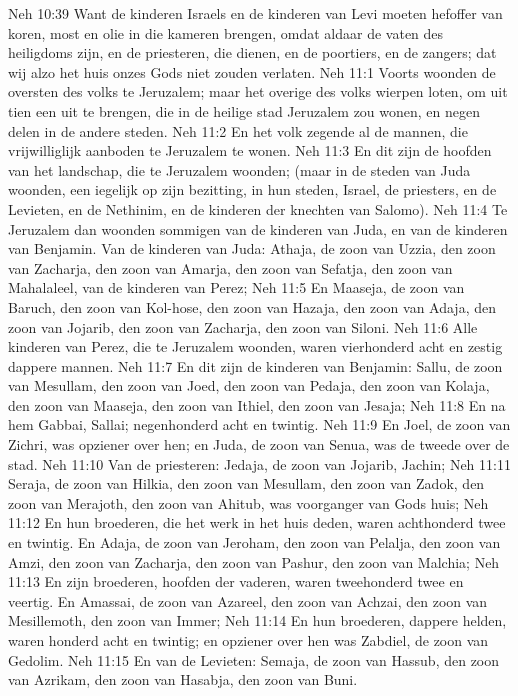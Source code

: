 Neh 10:39  Want de kinderen Israels en de kinderen van Levi moeten hefoffer van koren, most en olie in die kameren brengen, omdat aldaar de vaten des heiligdoms zijn, en de priesteren, die dienen, en de poortiers, en de zangers; dat wij alzo het huis onzes Gods niet zouden verlaten.
Neh 11:1  Voorts woonden de oversten des volks te Jeruzalem; maar het overige des volks wierpen loten, om uit tien een uit te brengen, die in de heilige stad Jeruzalem zou wonen, en negen delen in de andere steden.
Neh 11:2  En het volk zegende al de mannen, die vrijwilliglijk aanboden te Jeruzalem te wonen.
Neh 11:3  En dit zijn de hoofden van het landschap, die te Jeruzalem woonden; (maar in de steden van Juda woonden, een iegelijk op zijn bezitting, in hun steden, Israel, de priesters, en de Levieten, en de Nethinim, en de kinderen der knechten van Salomo).
Neh 11:4  Te Jeruzalem dan woonden sommigen van de kinderen van Juda, en van de kinderen van Benjamin. Van de kinderen van Juda: Athaja, de zoon van Uzzia, den zoon van Zacharja, den zoon van Amarja, den zoon van Sefatja, den zoon van Mahalaleel, van de kinderen van Perez;
Neh 11:5  En Maaseja, de zoon van Baruch, den zoon van Kol-hose, den zoon van Hazaja, den zoon van Adaja, den zoon van Jojarib, den zoon van Zacharja, den zoon van Siloni.
Neh 11:6  Alle kinderen van Perez, die te Jeruzalem woonden, waren vierhonderd acht en zestig dappere mannen.
Neh 11:7  En dit zijn de kinderen van Benjamin: Sallu, de zoon van Mesullam, den zoon van Joed, den zoon van Pedaja, den zoon van Kolaja, den zoon van Maaseja, den zoon van Ithiel, den zoon van Jesaja;
Neh 11:8  En na hem Gabbai, Sallai; negenhonderd acht en twintig.
Neh 11:9  En Joel, de zoon van Zichri, was opziener over hen; en Juda, de zoon van Senua, was de tweede over de stad.
Neh 11:10  Van de priesteren: Jedaja, de zoon van Jojarib, Jachin;
Neh 11:11  Seraja, de zoon van Hilkia, den zoon van Mesullam, den zoon van Zadok, den zoon van Merajoth, den zoon van Ahitub, was voorganger van Gods huis;
Neh 11:12  En hun broederen, die het werk in het huis deden, waren achthonderd twee en twintig. En Adaja, de zoon van Jeroham, den zoon van Pelalja, den zoon van Amzi, den zoon van Zacharja, den zoon van Pashur, den zoon van Malchia;
Neh 11:13  En zijn broederen, hoofden der vaderen, waren tweehonderd twee en veertig. En Amassai, de zoon van Azareel, den zoon van Achzai, den zoon van Mesillemoth, den zoon van Immer;
Neh 11:14  En hun broederen, dappere helden, waren honderd acht en twintig; en opziener over hen was Zabdiel, de zoon van Gedolim.
Neh 11:15  En van de Levieten: Semaja, de zoon van Hassub, den zoon van Azrikam, den zoon van Hasabja, den zoon van Buni.
